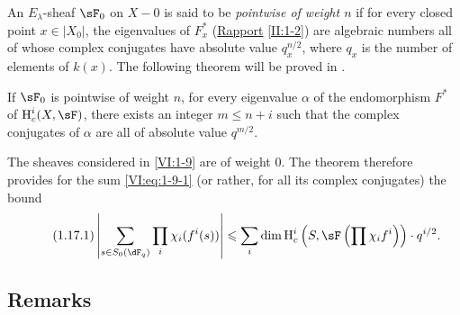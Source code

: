 An $E_\lambda$-sheaf $\sF_0$ on $X-0$ is said to be \emph{pointwise of
weight $n$} if for every closed point $x\in |X_0|$, the eigenvalues of
$F_x^\ast$ (\hyperref[II]{Rapport} \ref{II:1-2}) are algebraic numbers
all of whose complex conjugates have absolute value
$q_x^{n/2}$, where $q_x$ is the number of elements of $k(x)$. The following
theorem will be proved in \cite{de80}. 





\begin{theorem_}\label{VI:1-17}
If $\sF_0$ is pointwise of weight $n$, for every eigenvalue $\alpha$
of the endomorphism $F^\ast$ of $\h_c^i(X,\sF)$, there exists an integer
$m\leqslant n+i$ such that the complex conjugates of $\alpha$ are all of
absolute value $q^{m/2}$.
\end{theorem_}

The sheaves considered in \ref{VI:1-9} are of weight $0$. The theorem
therefore provides for the sum \ref{VI:eq:1-9-1} (or rather, for all its
complex conjugates) the bound 
\begin{equation*}\tag{1.17.1}\label{VI:eq:1-17-1}
  \left|\sum_{s\in S_0(\dF_q)} \prod_i \chi_i(f^i(s)) \right| \leqslant \sum_i \dim \h_c^i\left(S,\sF\left(\prod \chi_i f^i\right)\right)\cdot q^{i/2} \text{.}
\end{equation*}





\subsection{Remarks}\label{VI:1-18}


